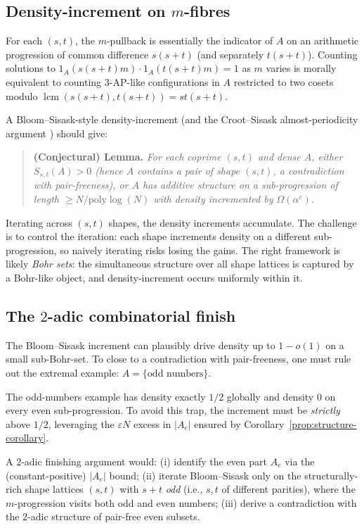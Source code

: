 \documentclass[11pt]{amsart}
\theoremstyle{plain}
\theoremstyle{definition}
\DeclareMathOperator{\lcm}{lcm}
\begin{document}
\subsection{Density-increment on $m$-fibres}

For each $(s, t)$, the $m$-pullback is essentially the indicator of $A$ on an arithmetic progression of common difference $s(s+t)$ (and separately $t(s+t)$). Counting solutions to $1_A(s(s+t)m) \cdot 1_A(t(s+t)m) = 1$ as $m$ varies is morally equivalent to counting 3-AP-like configurations in $A$ restricted to two cosets modulo $\lcm(s(s+t), t(s+t)) = st(s+t)$.

A Bloom--Sisask-style density-increment \cite{BloomSisask2020} (and the Croot--Sisask almost-periodicity argument \cite{CrootSisask}) should give:

\begin{quote}
\textbf{(Conjectural) Lemma.} \emph{For each coprime $(s, t)$ and dense $A$, either $S_{s,t}(A) > 0$ (hence $A$ contains a pair of shape $(s, t)$, a contradiction with pair-freeness), or $A$ has additive structure on a sub-progression of length $\geq N / \mathrm{poly}\log(N)$ with density incremented by $\Omega(\alpha^c)$.}
\end{quote}

Iterating across $(s, t)$ shapes, the density increments accumulate. The challenge is to control the iteration: each shape increments density on a different sub-progression, so naively iterating risks losing the gains. The right framework is likely \emph{Bohr sets}: the simultaneous structure over all shape lattices is captured by a Bohr-like object, and density-increment occurs uniformly within it.

\subsection{The $2$-adic combinatorial finish}

The Bloom--Sisask increment can plausibly drive density up to $1 - o(1)$ on a small sub-Bohr-set. To close to a contradiction with pair-freeness, one must rule out the extremal example: $A = \{\text{odd numbers}\}$.

The odd-numbers example has density exactly $1/2$ globally and density $0$ on every even sub-progression. To avoid this trap, the increment must be \emph{strictly} above $1/2$, leveraging the $\varepsilon N$ excess in $|A_e|$ ensured by Corollary~\ref{prop:structure-corollary}.

A $2$-adic finishing argument would: (i) identify the even part $A_e$ via the (constant-positive) $|A_e|$ bound; (ii) iterate Bloom--Sisask only on the structurally-rich shape lattices $(s, t)$ with $s + t$ \emph{odd} (i.e., $s, t$ of different parities), where the $m$-progression visits both odd and even numbers; (iii) derive a contradiction with the $2$-adic structure of pair-free even subsets.
\end{document}

